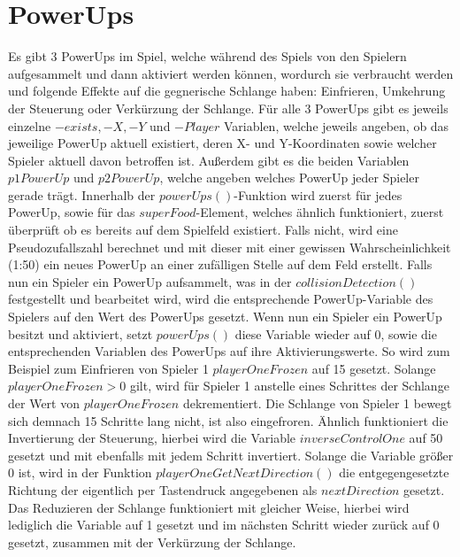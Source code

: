 \section{PowerUps}
\label{PowerUps}
%
Es gibt 3 PowerUps im Spiel, welche während des Spiels von den Spielern aufgesammelt und dann aktiviert werden können, wordurch sie verbraucht werden und folgende Effekte auf die gegnerische Schlange haben: Einfrieren, Umkehrung der Steuerung oder Verkürzung der Schlange. Für alle 3 PowerUps gibt es jeweils einzelne $-exists, -X, -Y$ und $-Player$ Variablen, welche jeweils angeben, ob das jeweilige PowerUp aktuell existiert, deren X- und Y-Koordinaten sowie welcher Spieler aktuell davon betroffen ist. Außerdem gibt es die beiden Variablen $p1PowerUp$ und $p2PowerUp$, welche angeben welches PowerUp jeder Spieler gerade trägt.
Innerhalb der $powerUps()$-Funktion wird zuerst für jedes PowerUp, sowie für das $superFood$-Element, welches ähnlich funktioniert, zuerst überprüft ob es bereits auf dem Spielfeld existiert. Falls nicht, wird eine Pseudozufallszahl berechnet und mit dieser mit einer gewissen Wahrscheinlichkeit (1:50) ein neues PowerUp an einer zufälligen Stelle auf dem Feld erstellt. Falls nun ein Spieler ein PowerUp aufsammelt, was in der $collisionDetection()$ festgestellt und bearbeitet wird, wird die entsprechende PowerUp-Variable des Spielers auf den Wert des PowerUps gesetzt. Wenn nun ein Spieler ein PowerUp besitzt und aktiviert, setzt $powerUps()$ diese Variable wieder auf 0, sowie die entsprechenden Variablen des PowerUps auf ihre Aktivierungswerte. So wird zum Beispiel zum Einfrieren von Spieler 1 $playerOneFrozen$ auf 15 gesetzt. Solange $playerOneFrozen > 0$ gilt, wird für Spieler 1 anstelle eines Schrittes der Schlange der Wert von $playerOneFrozen$ dekrementiert. Die Schlange von Spieler 1 bewegt sich demnach 15 Schritte lang nicht, ist also eingefroren. Ähnlich funktioniert die Invertierung der Steuerung, hierbei wird die Variable $inverseControlOne$ auf 50 gesetzt und mit ebenfalls mit jedem Schritt invertiert. Solange die Variable größer 0 ist, wird in der Funktion $playerOneGetNextDirection()$ die entgegengesetzte Richtung der eigentlich per Tastendruck angegebenen als $nextDirection$ gesetzt. Das Reduzieren der Schlange funktioniert mit gleicher Weise, hierbei wird lediglich die Variable auf 1 gesetzt und im nächsten Schritt wieder zurück auf 0 gesetzt, zusammen mit der Verkürzung der Schlange. 
%
